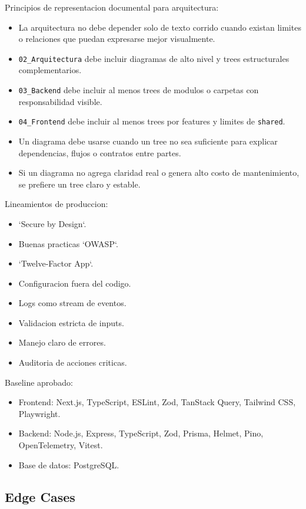 Principios de representacion documental para arquitectura:

\begin{itemize}
  \item La arquitectura no debe depender solo de texto corrido cuando existan limites o relaciones que puedan expresarse mejor visualmente.
  \item \texttt{02\_Arquitectura} debe incluir diagramas de alto nivel y trees estructurales complementarios.
  \item \texttt{03\_Backend} debe incluir al menos trees de modulos o carpetas con responsabilidad visible.
  \item \texttt{04\_Frontend} debe incluir al menos trees por features y limites de \texttt{shared}.
  \item Un diagrama debe usarse cuando un tree no sea suficiente para explicar dependencias, flujos o contratos entre partes.
  \item Si un diagrama no agrega claridad real o genera alto costo de mantenimiento, se prefiere un tree claro y estable.
\end{itemize}

Lineamientos de produccion:

\begin{itemize}
  \item `Secure by Design`.
  \item Buenas practicas `OWASP`.
  \item `Twelve-Factor App`.
  \item Configuracion fuera del codigo.
  \item Logs como stream de eventos.
  \item Validacion estricta de inputs.
  \item Manejo claro de errores.
  \item Auditoria de acciones criticas.
\end{itemize}

Baseline aprobado:

\begin{itemize}
  \item Frontend: Next.js, TypeScript, ESLint, Zod, TanStack Query, Tailwind CSS, Playwright.
  \item Backend: Node.js, Express, TypeScript, Zod, Prisma, Helmet, Pino, OpenTelemetry, Vitest.
  \item Base de datos: PostgreSQL.
\end{itemize}

\subsection{Edge Cases}


